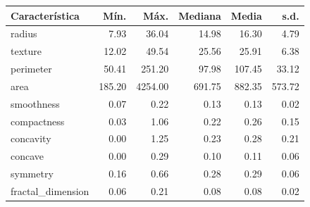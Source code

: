 \begin{tabular*}{\textwidth}{@{\extracolsep{\fill}}lrrrrr}
\toprule
Característica & Mín. & Máx. & Mediana & Media & s.d. \\
\midrule
radius & 7.93 & 36.04 & 14.98 & 16.30 & 4.79\\
texture & 12.02 & 49.54 & 25.56 & 25.91 & 6.38\\
perimeter & 50.41 & 251.20 & 97.98 & 107.45 & 33.12\\
area & 185.20 & 4254.00 & 691.75 & 882.35 & 573.72\\
smoothness & 0.07 & 0.22 & 0.13 & 0.13 & 0.02\\
\addlinespace
compactness & 0.03 & 1.06 & 0.22 & 0.26 & 0.15\\
concavity & 0.00 & 1.25 & 0.23 & 0.28 & 0.21\\
concave & 0.00 & 0.29 & 0.10 & 0.11 & 0.06\\
symmetry & 0.16 & 0.66 & 0.28 & 0.29 & 0.06\\
fractal\_dimension & 0.06 & 0.21 & 0.08 & 0.08 & 0.02\\
\bottomrule
\end{tabular*}
